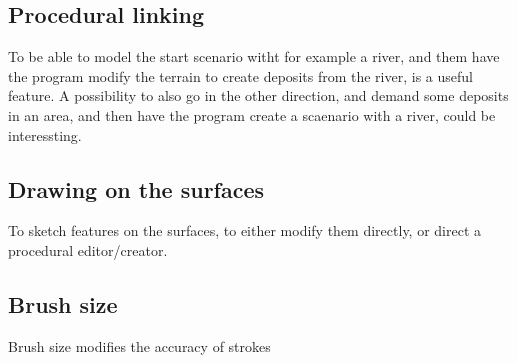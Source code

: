 \documentclass[a4paper,10pt]{article}
\begin{document}
\subsection{Procedural linking}
To be able to model the start scenario witht for example a river, and them have the program modify the terrain to create deposits from the river, is a useful feature. A possibility to also go in the other direction, and demand some deposits in an area, and then have the program create a scaenario with a river, could be interessting.
\subsection{Drawing on the surfaces}
To sketch features on the surfaces, to either modify them directly, or direct a procedural editor/creator.
\subsection{Brush size}
Brush size modifies the accuracy of strokes
\end{document}
